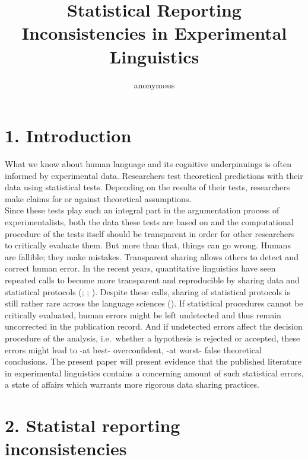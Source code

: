 \documentclass[
  doc,
  longtable,
  nolmodern,
  notxfonts,
  notimes,
  colorlinks=true,linkcolor=blue,citecolor=blue,urlcolor=blue]{apa7}
\title{Statistical Reporting Inconsistencies in Experimental
Linguistics}
\author{anonymous}
\affiliation{
{anonymous}}
\begin{document}
\maketitle


\setcounter{secnumdepth}{-\maxdimen} %

\setlength\LTleft{0pt}


\section{1. Introduction}\label{introduction}

What we know about human language and its cognitive underpinnings is
often informed by experimental data. Researchers test theoretical
predictions with their data using statistical tests. Depending on the
results of their tests, researchers make claims for or against
theoretical assumptions.\\
Since these tests play such an integral part in the argumentation
process of experimentalists, both the data these tests are based on and
the computational procedure of the tests itself should be transparent in
order for other researchers to critically evaluate them. But more than
that, things can go wrong. Humans are fallible; they make mistakes.
Transparent sharing allows others to detect and correct human error. In
the recent years, quantitative linguistics have seen repeated calls to
become more transparent and reproducible by sharing data and statistical
protocols (;
;
). Despite these
calls, sharing of statistical protocols is still rather rare across the
language sciences (). If statistical procedures cannot be critically evaluated,
human errors might be left undetected and thus remain uncorrected in the
publication record. And if undetected errors affect the decision
procedure of the analysis, i.e.~whether a hypothesis is rejected or
accepted, these errors might lead to -at best- overconfident, -at worst-
false theoretical conclusions. The present paper will present evidence
that the published literature in experimental linguistics contains a
concerning amount of such statistical errors, a state of affairs which
warrants more rigorous data sharing practices.

\section{2. Statistal reporting
inconsistencies}\label{statistal-reporting-inconsistencies}
\end{document}
